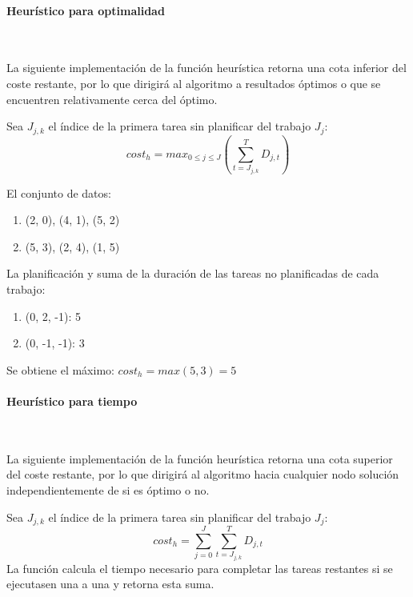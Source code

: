 \paragraph{Heurístico para optimalidad}~

La siguiente implementación de la función heurística
retorna una cota inferior del coste restante,
por lo que dirigirá al algoritmo a resultados óptimos
o que se encuentren relativamente cerca del óptimo.

Sea $J_{j,k}$ el índice de la primera tarea sin planificar
del trabajo $J_j$:
$$
    cost_h = max_{0 \leq j \le J}\left(
        \sum_{t=J_{j,k}}^{T}{D_{j,t}}
    \right)
$$
\begin{examplebox}
    El conjunto de datos:
    \begin{enumerate}[itemsep=0.25px]
        \item (2, 0), (4, 1), (5, 2)
        \item (5, 3), (2, 4), (1, 5)
    \end{enumerate}
    La planificación y suma de la duración de las tareas no planificadas de cada trabajo:
    \begin{enumerate}[itemsep=0.25px]
        \item (0, 2, -1): 5
        \item (0, -1, -1): 3
    \end{enumerate}
    Se obtiene el máximo: $cost_h = max(5, 3) = 5$
\end{examplebox}

\pagebreak

\paragraph{Heurístico para tiempo}~

La siguiente implementación de la función heurística
retorna una cota superior del coste restante,
por lo que dirigirá al algoritmo hacia cualquier nodo solución
independientemente de si es óptimo o no.

Sea $J_{j,k}$ el índice de la primera tarea sin planificar
del trabajo $J_j$:
$$
    cost_h = \sum_{j=0}^{J}{\sum_{t=J_{j,k}}^{T}{D_{j,t}}}
$$
La función calcula el tiempo necesario para completar
las tareas restantes si se ejecutasen una a una
y retorna esta suma.

